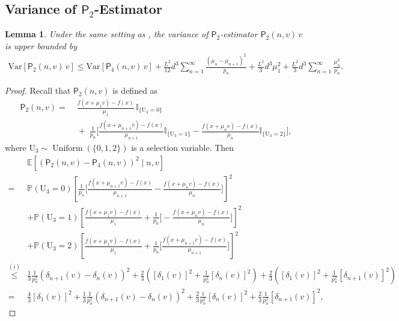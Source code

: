 \documentclass{article}
\newcommand{\Var}{\mathrm{Var}}
\newcommand{\EE}{\mathbb{E}}
\newcommand{\PP}{\mathbb{P}}
\theoremstyle{definition}
\theoremstyle{plain}
\newtheorem{lemma}[definition]{Lemma}
\theoremstyle{remark}
\newcommand{\sfP}{\mathsf{P}}
\begin{document}
\subsection{Variance of $\mathsf{P}_2$-Estimator} %

\begin{lemma}\label{lemma:variance-p2}
    Under the same setting as , the variance of $\sfP_2$-estimator $\mathsf P_2(n,v)\,v$ is upper bounded by
\begin{align*}
    \Var[\sfP_2(n,v) \, v ]  
    \leq  \Var[\sfP_4(n,v)\, v] + \frac{L^2}{12}  d^3\sum_{n=1}^\infty \frac{(\mu_n - \mu_{n+1})^2}{p_n} + \frac{L^2 }{3} d^3\mu_1^2 + \frac{L^2}{3} d^3 \sum_{n=1}^\infty \frac{\mu_n^2}{p_n}.
\end{align*}
\end{lemma}
\begin{proof}
Recall that $\mathsf{P}_2(n,v)$ is defined as 
\begin{align*}
    \mathsf{P}_2(n, v)
= 
&\;\frac{f(x+\mu_1 v)-f(x)}{\mu_1}\,\mathbb{I}_{\{\mathrm{U}_3=0\}}  \\ 
&\;+\;\frac{1}{p_n}\Biggl[
    \frac{f(x+\mu_{n+1} v)-f(x)}{\mu_{n+1}}\mathbb{I}_{\{\mathrm{U}_3=1\}}
  - \frac{f(x+\mu_n v)-f(x)}{\mu_n}\mathbb{I}_{\{\mathrm{U}_3=2\}}
\Biggr],
\end{align*} 
where $\mathrm{U}_3\sim  \operatorname{Uniform}\left( \{ 0, 1,2 \}\right)$ is a selection variable. Then 
\begin{align*}
    &\EE[ (\mathsf{P}_2(n, v) - \mathsf{P}_4(n, v))^2\mid n,v] \\
    = &\PP(\mathrm{U}_3=0) \left[  \frac{1}{p_n}\Biggl[ \frac{f(x+\mu_{n+1} v)-f(x)}{\mu_{n+1}} - \frac{f(x+\mu_n v)-f(x)}{\mu_n} \Biggr] \right]^2  \\ 
    &+\PP(\mathrm{U}_3=1) \left[\frac{f(x+\mu_1 v)-f(x)}{\mu_1}  +    \frac{1}{p_n}\Biggl[  - \frac{f(x+\mu_n v)-f(x)}{\mu_n} \Biggr] \right]^2  \\ 
      &+\PP(\mathrm{U}_3=2) \left[\frac{f(x+\mu_1 v)-f(x)}{\mu_1}  +   \frac{1}{p_n}\Biggl[ \frac{f(x+\mu_{n+1} v)-f(x)}{\mu_{n+1}} \Biggr]  \right]^2  \\  
    \overset{(i)}{\leq} & \frac{1}{3} \frac{1}{p_n^2} \left( \delta_{n+1}(v) - \delta_n(v)\right)^2 + \frac{2}{3} \left( [\delta_1(v)]^2 + \frac{1}{p_n^2} [\delta_n(v)]^2 \right)+ \frac{2}{3} \left( [\delta_1(v)]^2 + \frac{1}{p_n^2} [\delta_{n+1}(v)]^2 \right)\\
   = &  \frac{4}{3}[\delta_1(v)]^2  + \frac{1}{3} \frac{1}{p_n^2} \left( \delta_{n+1}(v) - \delta_n(v)\right)^2 + \frac{2}{3} \frac{1}{p_n^2} [\delta_{n}(v)]^2 +  \frac{2}{3} \frac{1}{p_n^2} [\delta_{n+1}(v)]^2 ,

\end{align*}
\end{proof}
\end{document}
